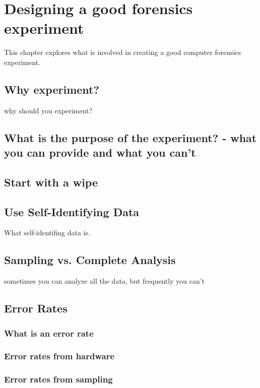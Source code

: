 \chapter{Designing a good forensics experiment}

This chapter explores what is involved in creating a good computer
forensics experiment.

\section{Why experiment?}

why should you experiment?

\section{What is the purpose of the experiment? - what you can provide and what you can't}
\section{Start with a wipe}
\section{Use Self-Identifying Data}

What self-identifing data is.



\section{Sampling vs. Complete Analysis}

sometimes you can analyze all the data, but frequently you can't

\section{Error Rates}
\subsection{What is an error rate}
\subsection{Error rates from hardware}
\subsection{Error rates from sampling}
